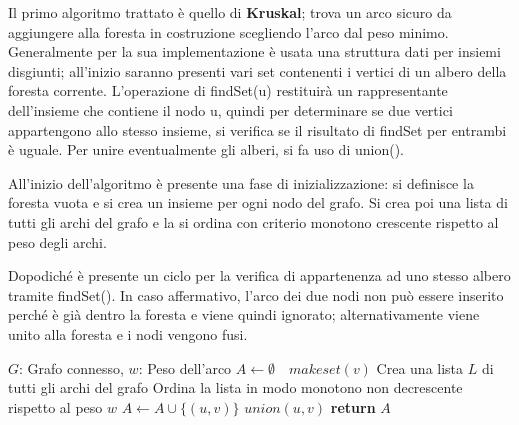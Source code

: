 \noindent Il primo algoritmo trattato è quello di \textbf{Kruskal}; trova un arco sicuro da aggiungere alla foresta in costruzione scegliendo l'arco dal peso minimo. Generalmente per la sua implementazione è usata una struttura dati per insiemi disgiunti; all'inizio saranno presenti vari set contenenti i vertici di un albero della foresta corrente. L'operazione di findSet(u) restituirà un rappresentante dell'insieme che contiene il nodo u, quindi per determinare se due vertici appartengono allo stesso insieme, si verifica se il risultato di findSet per entrambi è uguale. Per unire eventualmente gli alberi, si fa uso di union().\par
All'inizio dell'algoritmo è presente una fase di inizializzazione: si definisce la foresta vuota e si crea un insieme per ogni nodo del grafo. Si crea poi una lista di tutti gli archi del grafo e la si ordina con criterio monotono crescente rispetto al peso degli archi.\par
Dopodiché è presente un ciclo per la verifica di appartenenza ad uno stesso albero tramite findSet(). In caso affermativo, l'arco dei due nodi non può essere inserito perché è già dentro la foresta e viene quindi ignorato; alternativamente viene unito alla foresta e i nodi vengono fusi.
\begin{algorithm}[h]
	\caption{kruskal(G, w)}
	\begin{algorithmic}[i]
		\Require $G$: Grafo connesso, $w$: Peso dell'arco
		\State $A\gets\emptyset$
		 $\text{ }makeset(v)$
		\State Crea una lista $L$ di tutti gli archi del grafo
		\State Ordina la lista in modo monotono non decrescente rispetto al peso $w$
		\EndFor
		 
		\State $A\gets A\cup \{(u,v)\}$
		\State $union(u,v)$
		\EndIf
		\EndFor
		\State \textbf{return} $A$
	\end{algorithmic}
\end{algorithm}

